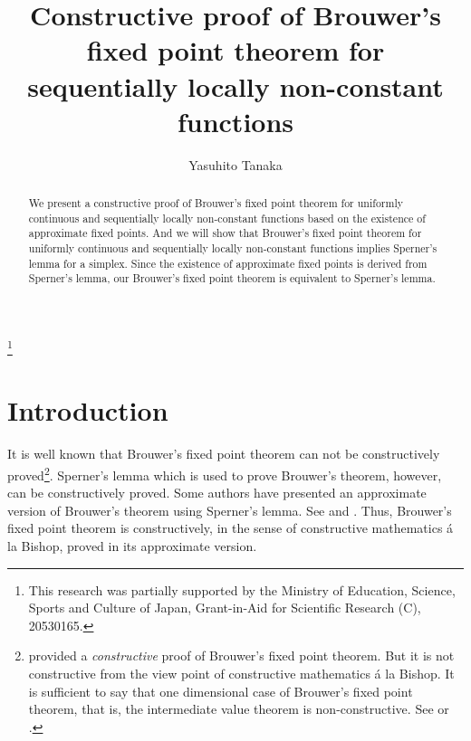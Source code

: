 \documentclass[reqno]{amsart}
\begin{document}


\title[Constructive proof of Brouwer's fixed point theorem]{Constructive proof of Brouwer's fixed point theorem for sequentially locally non-constant functions}

\author{Yasuhito Tanaka}
\address{Faculty of Economics, Doshisha University, Kamigyo-ku, Kyoto, 602-8580, Japan}
\thanks{This research was partially supported by the Ministry of Education, Science, Sports and Culture of Japan, Grant-in-Aid for Scientific Research (C), 20530165.}\address{Faculty of Economics, Doshisha University, Kamigyo-ku, Kyoto, 602-8580, Japan}

\date{}



\begin{abstract}  
We present a constructive proof of Brouwer's fixed point theorem for uniformly continuous and sequentially locally non-constant functions based on the existence of approximate fixed points. And we will show that Brouwer's fixed point theorem for uniformly continuous and sequentially locally non-constant functions implies Sperner's lemma for a simplex. Since the existence of approximate fixed points is derived from Sperner's lemma, our Brouwer's fixed point theorem is equivalent to Sperner's lemma. 
\end{abstract}

\maketitle

\section{Introduction}

It is well known that Brouwer's fixed point theorem can not be constructively proved\footnote{\cite{kel} provided a \emph{constructive} proof of Brouwer's fixed point theorem. But it is not constructive from the view point of constructive mathematics \'{a} la Bishop. It is sufficient to say that one dimensional case of Brouwer's fixed point theorem, that is, the intermediate value theorem is non-constructive. See \cite{br} or \cite{da}.}. Sperner's lemma which is used to prove Brouwer's theorem, however, can be constructively proved. Some authors have presented an approximate version of Brouwer's theorem using Sperner's lemma. See \cite{da} and \cite{veld}.  Thus, Brouwer's fixed point theorem is constructively, in the sense of constructive mathematics \'{a} la Bishop, proved in its approximate version.
\end{document}
